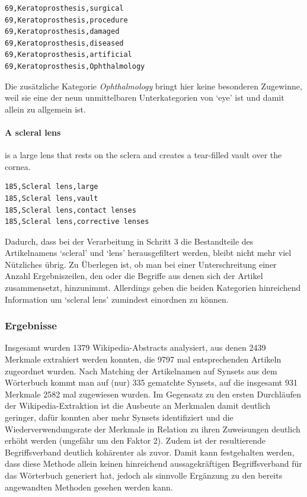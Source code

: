 \documentclass[pagesize,DIV=calc,12pt,draft]{scrreprt}
\begin{document}
\begin{lstlisting}
69,Keratoprosthesis,surgical 
69,Keratoprosthesis,procedure
69,Keratoprosthesis,damaged 
69,Keratoprosthesis,diseased
69,Keratoprosthesis,artificial 
69,Keratoprosthesis,Ophthalmology
\end{lstlisting}

Die zusätzliche Kategorie \emph{Ophthalmology} bringt hier keine besonderen Zugewinne, weil sie eine der neun unmittelbaren Unterkategorien von `eye' ist und damit allein zu allgemein ist.

\paragraph{A scleral lens}
is a large lens that rests on the sclera and creates a tear-filled vault over the cornea.

\begin{lstlisting}
185,Scleral lens,large 
185,Scleral lens,vault 
185,Scleral lens,contact lenses 
185,Scleral lens,corrective lenses
\end{lstlisting}

Dadurch, dass bei der Verarbeitung in Schritt 3 die Bestandteile des Artikelnamens `scleral' und `lens' herausgefiltert werden, bleibt nicht mehr viel Nützliches übrig. 
Zu Überlegen ist, ob man bei einer Unterschreitung einer Anzahl Ergebniszeilen, den oder die Begriffe aus denen sich der Artikel zusammensetzt, hinzunimmt. 
Allerdings geben die beiden Kategorien hinreichend Information um `scleral lens' zumindest einordnen zu können. 

\subsubsection{Ergebnisse}

Insgesamt wurden 1379 Wikipedia-Abstracts analysiert, aus denen 2439 Merkmale extrahiert werden konnten, die 9797 mal entsprechenden Artikeln zugeordnet wurden. 
Nach Matching der Artikelnamen auf Synsets aus dem Wörterbuch kommt man auf (nur) 335 gematchte Synsets, auf die insgesamt 931 Merkmale 2582 mal zugewiesen wurden. 
Im Gegensatz zu den ersten Durchläufen der Wikipedia-Extraktion ist die Ausbeute an Merkmalen damit deutlich geringer, dafür konnten aber mehr Synsets identifiziert und die Wiederverwendungsrate der Merkmale in Relation zu ihren Zuweisungen deutlich erhöht werden (ungefähr um den Faktor 2). 
Zudem ist der resultierende Begriffsverband deutlich kohärenter als zuvor. 
Damit kann festgehalten werden, dass diese Methode allein keinen hinreichend aussagekräftigen Begriffsverband für das Wörterbuch generiert hat, jedoch als sinnvolle Ergänzung zu den bereits angewandten Methoden gesehen werden kann. 
\end{document}

